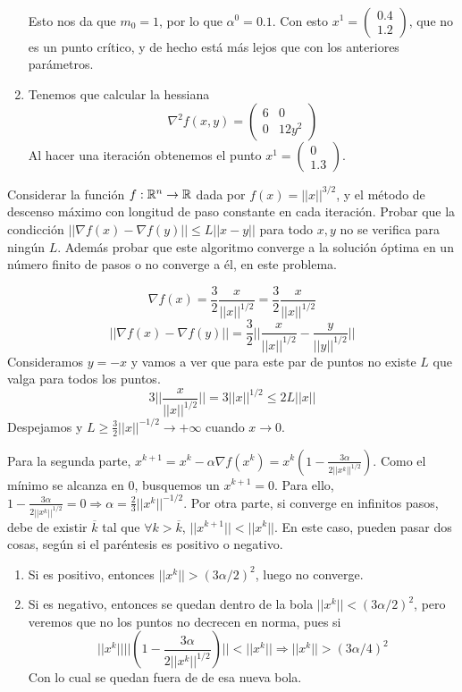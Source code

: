 \documentclass[twoside]{article}
\begin{document}
\begin{solucion}
\begin{enumerate}
\begin{gather*}
\end{gather*}
Esto nos da que $m_0=1$, por lo que $\alpha^0=0.1$. Con esto $x^1=\begin{pmatrix}
0.4\\
1.2
\end{pmatrix}$, que no es un punto crítico, y de hecho está más lejos que con los anteriores parámetros.
\item Tenemos que calcular la hessiana
$$\nabla^2f(x,y)=\begin{pmatrix}
6 & 0\\
0 & 12y^2
\end{pmatrix}$$
Al hacer una iteración obtenemos el punto $x^1=\begin{pmatrix}
0\\
1.3
\end{pmatrix}$.
\end{enumerate}
\end{solucion}

\newpage

\begin{ejercicio}{7}
Considerar la función $f:\mathbb{R}^n\to\mathbb{R}$ dada por $f(x)=||x||^{3/2}$, y el método de descenso máximo con longitud de paso constante en cada iteración. Probar que la condicción $||\nabla f(x)-\nabla f(y)||\leq L||x-y||$ para todo $x,y$ no se verifica para ningún $L$. Además probar que este algoritmo converge a la solución óptima en un número finito de pasos o no converge a él, en este problema.
\end{ejercicio}
\begin{solucion}
$$\nabla f(x)=\frac{3}{2}\frac{x}{||x||^{1/2}}=\frac{3}{2}\frac{x}{||x||^{1/2}}$$
$$||\nabla f(x)-\nabla f(y)||=\frac{3}{2}||\frac{x}{||x||^{1/2}}-\frac{y}{||y||^{1/2}}||$$
Consideramos $y=-x$ y vamos a ver que para este par de puntos no existe $L$ que valga para todos los puntos.
$$3||\frac{x}{||x||^{1/2}}||=3||x||^{1/2}\leq 2L||x||$$
Despejamos y $L\geq\frac{3}{2}||x||^{-1/2}\to +\infty$ cuando $x\to 0$.

Para la segunda parte, $x^{k+1}=x^k-\alpha\nabla f(x^k)=x^k\left(1-\frac{3\alpha}{2||x^k||^{1/2}}\right)$. Como el mínimo se alcanza en 0, busquemos un $x^{k+1}=0$. Para ello, $1-\frac{3\alpha}{2||x^k||^{1/2}}=0\Rightarrow \alpha=\frac{2}{3}||x^k||^{-1/2}$. 
Por otra parte, si converge en infinitos pasos, debe de existir $\overline{k}$ tal que $\forall k>\overline{k}$, $||x^{k+1}||<||x^k||$. En este caso, pueden pasar dos cosas, según si el paréntesis es positivo o negativo.
\begin{enumerate}
\item Si es positivo, entonces $||x^k||>(3\alpha/2)^2$, luego no converge. 
\item Si es negativo, entonces se quedan dentro de la bola $||x^k||<(3\alpha/2)^2$, pero veremos que no los puntos no decrecen en norma, pues si 
$$||x^k||||\left(1-\frac{3\alpha}{2||x^k||^{1/2}}\right)||<||x^k||\Rightarrow ||x^k||>(3\alpha/4)^2$$
Con lo cual se quedan fuera de de esa nueva bola.
\end{enumerate}
\end{solucion}
\end{document}
